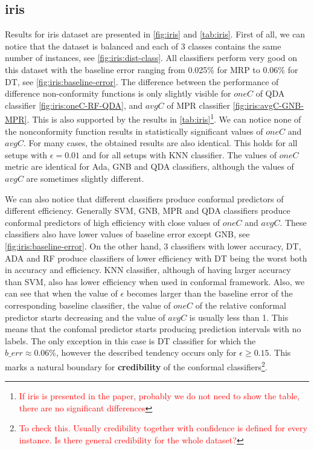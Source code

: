 \subsection{iris}

Results for iris dataset are presented in \cref{fig:iris} and \cref{tab:iris}. 
First of all, we can notice that the dataset is balanced and each of 3 classes contains the
same number of instances, see \cref{fig:iris:dist-class}. All classifiers perform very good on this dataset with the baseline error ranging from 0.025\% for MRP to 0.06\% for DT, see 
\cref{fig:iris:baseline-error}. The difference between the performance of difference 
non-conformity functions is only slightly visible for $oneC$ of QDA classifier 
\cref{fig:iris:oneC-RF-QDA}, and $avgC$ of MPR classifier \cref{fig:iris:avgC-GNB-MPR}.
This is also supported by the results in \cref{tab:iris}\footnote{\textcolor{red}{If iris is presented in the paper, probably we do not need to show the table, there are no significant differences}}. 
We can notice none of the nonconformity function results in statistically significant 
values of $oneC$ and $avgC$. For many cases, the obtained results are also identical. This 
holds for all setups with $\epsilon=0.01$ and for all setups with KNN classifier. The 
values of $oneC$ metric are identical for Ada, GNB and QDA classifiers, although the values
of $avgC$ are sometimes slightly different.

We can also notice that different classifiers produce conformal predictors of different
efficiency. Generally SVM, GNB, MPR and QDA classifiers produce conformal predictors of 
high efficiency with close values of $oneC$ and $avgC$. These classifiers also have lower
values of baseline error except GNB, see \cref{fig:iris:baseline-error}. On the other hand, 3 classifiers with lower accuracy, DT, ADA and RF produce classifiers of lower efficiency with DT being the worst both in accuracy and efficiency.
KNN classifier, although of having larger accuracy than SVM, also has lower efficiency when
used in conformal framework. Also, we can see that when the value of $\epsilon$ becomes larger than the baseline error of the corresponding baseline classifier, the value of $oneC$ of the relative conformal predictor starts decreasing and the value of $avgC$ is usually less than 1. This means that the confomal predictor starts producing prediction intervals with no labels. The only exception in this case is DT classifier for which the
$b\_err \approx 0.06\%$, however the described tendency occurs only for $\epsilon \ge 0.15$. 
This marks a natural boundary for \textbf{credibility} of the conformal classifiers\footnote{
\textcolor{red}{To check this. Usually credibility together with confidence is defined for every instance. Is there general credibility for the whole dataset?}
}.

